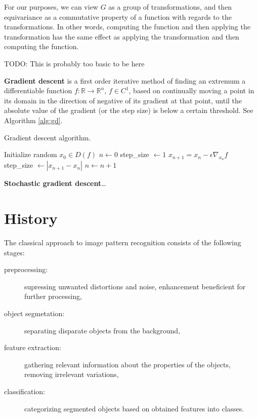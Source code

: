 \documentclass[11pt,czech,american,dvipsnames]{book}
\newcommand{\RR}{\mathbb{R}}
\begin{document}
For our purposes, we can view $G$ as a group of transformations, and then equivariance as a commutative property of a function with regards to the transformations. In other words, computing the function and then applying the transformation has the same effect as applying the transformation and then computing the function.

TODO: This is probably too basic to be here

\textbf{Gradient descent} is a first order iterative method of finding an extremum a differentiable function $f : \RR \rightarrow \RR^n$, $f \in C^1$, based on continually moving a point in its domain in the direction of negative of its gradient at that point, until the absolute value of the gradient (or the step size) is below a certain threshold. See Algorithm \ref{alg:gd}.

\begin{algorithm}
  \caption{Gradient descent algorithm.}
  \label{alg:gd}
\begin{algorithmic}[1]
  \State Initialize random $x_0 \in D(f)$
  \State $n \gets 0$
  \State step\_size $\gets 1$  
  \State $x_{n+1} = x_n - \epsilon \nabla_{x_n} f$
  \State step\_size $\gets |x_{n+1} - x_n|$ 
  \State $n \gets n + 1$
  \EndWhile
\end{algorithmic}
\end{algorithm}

\textbf{Stochastic gradient descent}\dots

\section{History}

The classical approach to image pattern recognition consists of the following stages:
\begin{description}
  \item[preprocessing:] supressing unwanted distortions and noise, enhancement beneficient for further processing,
  \item[object segmetation:] separating disparate objects from the background,
  \item[feature extraction:] gathering relevant information about the properties of the objects, removing irrelevant variations,
  \item[classification:] categorizing segmented objects based on obtained features into classes.
\end{description}
\end{document}
